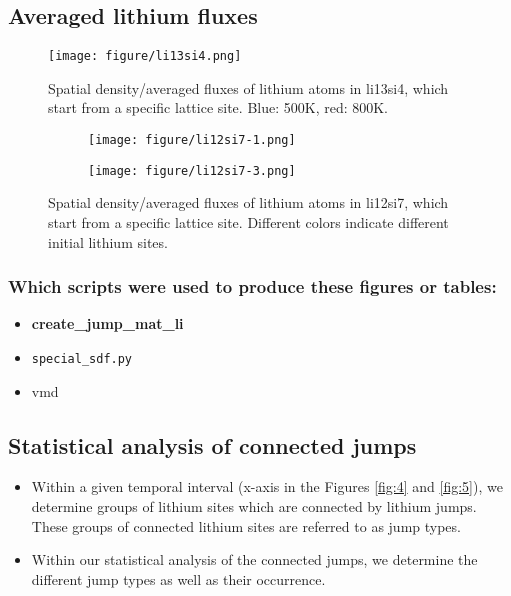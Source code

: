 \documentclass{article}
\begin{document}
 \subsection{Averaged lithium fluxes}

\begin{figure}[h!]
\centering
\texttt{[image: figure/li13si4.png]}
\caption{Spatial density/averaged fluxes of lithium atoms in li13si4, which start from a specific lattice site. Blue: 500K, red: 800K.} 
\end{figure}

\begin{figure}[ht!]
\centering
\begin{subfigure}[b]{0.49\linewidth}
\texttt{[image: figure/li12si7-1.png]}
\end{subfigure}%
\quad
\begin{subfigure}[b]{0.49\linewidth}
\texttt{[image: figure/li12si7-3.png]}
\end{subfigure}
\caption{Spatial density/averaged fluxes of lithium atoms in li12si7, which start from a specific lattice site. Different colors indicate different initial lithium sites.} 
\label{fig:snapi2}
\end{figure}



\subsubsection{Which scripts were used to produce these figures or tables:}


\begin{itemize}
  \item \textbf{create\_jump\_mat\_li}
  \item  \begin{verbatim}special_sdf.py\end{verbatim}
  \item vmd 
  \end{itemize}
  

\FloatBarrier

\subsection{Statistical analysis of connected jumps}


\begin{itemize}
\item Within a given temporal interval (x-axis in the Figures \ref{fig:4} and \ref{fig:5}), we determine groups of lithium sites which are connected by lithium jumps. These groups of connected lithium sites are referred to as jump types. 
\item Within our statistical analysis of the connected jumps, we determine the different jump types as well as  their occurrence.  
\end{itemize}
\end{document}
